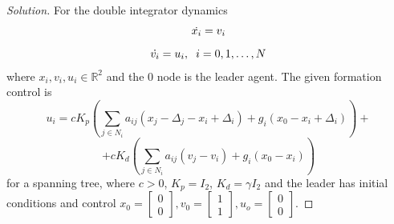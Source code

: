 \documentclass[12pt]{article}
\newenvironment{solution}{\begin{proof}[Solution]}{\end{proof}}
\begin{document}
\begin{solution}
For the double integrator dynamics
\begin{equation*}
\dot{x_i}=v_i\\
\end{equation*}
\begin{equation*}
\dot{v_i}=u_i, \hspace{.2cm} i=0,1, \hdots, N
\end{equation*}
where $x_i, v_i, u_i \in \mathbb{R}^2$ and the $0$ node is the leader agent.
The given formation control is 
\begin{equation*}
u_i= cK_p(\sum_{j\in N_i}a_{ij}(x_j-\Delta_j-x_i+\Delta_i)+g_i(x_0-x_i+\Delta_i))+
\end{equation*}
\begin{equation*}
+cK_d(\sum_{j\in N_i}a_{ij}(v_j-v_i)+g_i(x_0-x_i))
\end{equation*}
for a spanning tree, where $c>0$, $K_p=I_2$, $K_d=\gamma I_2$ and the leader has initial conditions and control $  x_0=\begin{bmatrix}
0\\
0
\end{bmatrix},  v_0=\begin{bmatrix}
1\\
1
\end{bmatrix}, u_o=\begin{bmatrix}
0\\
0
\end{bmatrix} $.


\end{solution}
\end{document}
